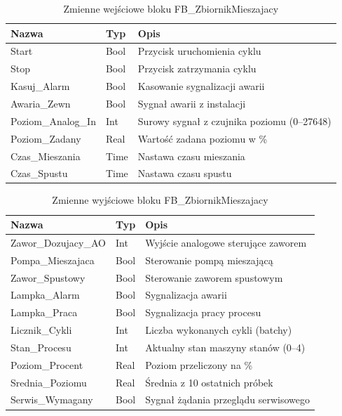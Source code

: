 \documentclass[12pt,a4paper]{report}
\begin{document}
\begin{table}[H]
\centering
\caption{Zmienne wejściowe bloku FB\_ZbiornikMieszajacy}
\begin{tabular}{@{}lll@{}}
\toprule
\textbf{Nazwa} & \textbf{Typ} & \textbf{Opis} \\
\midrule
Start & Bool & Przycisk uruchomienia cyklu \\
Stop & Bool & Przycisk zatrzymania cyklu \\
Kasuj\_Alarm & Bool & Kasowanie sygnalizacji awarii \\
Awaria\_Zewn & Bool & Sygnał awarii z instalacji \\
Poziom\_Analog\_In & Int & Surowy sygnał z czujnika poziomu (0--27648) \\
Poziom\_Zadany & Real & Wartość zadana poziomu w \% \\
Czas\_Mieszania & Time & Nastawa czasu mieszania \\
Czas\_Spustu & Time & Nastawa czasu spustu \\
\bottomrule
\end{tabular}
\end{table}

\begin{table}[H]
\centering
\caption{Zmienne wyjściowe bloku FB\_ZbiornikMieszajacy}
\begin{tabular}{@{}lll@{}}
\toprule
\textbf{Nazwa} & \textbf{Typ} & \textbf{Opis} \\
\midrule
Zawor\_Dozujacy\_AO & Int & Wyjście analogowe sterujące zaworem \\
Pompa\_Mieszajaca & Bool & Sterowanie pompą mieszającą \\
Zawor\_Spustowy & Bool & Sterowanie zaworem spustowym \\
Lampka\_Alarm & Bool & Sygnalizacja awarii \\
Lampka\_Praca & Bool & Sygnalizacja pracy procesu \\
Licznik\_Cykli & Int & Liczba wykonanych cykli (batchy) \\
Stan\_Procesu & Int & Aktualny stan maszyny stanów (0--4) \\
Poziom\_Procent & Real & Poziom przeliczony na \% \\
Srednia\_Poziomu & Real & Średnia z 10 ostatnich próbek \\
Serwis\_Wymagany & Bool & Sygnał żądania przeglądu serwisowego \\
\bottomrule
\end{tabular}
\end{table}
\end{document}
